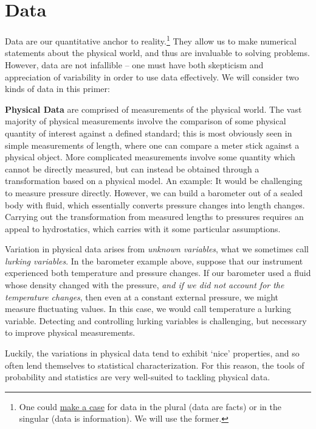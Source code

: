 \documentclass[../primer.tex]{subfiles}
\begin{document}
\section{Data} \label{sec:data}
Data are our quantitative anchor to reality.\footnote{One could
  \href{http://phdcomics.com/comics.php?f=1816}{make a case} for data in the
  plural (data are facts) or in the singular (data is information). We will use
  the former.} They allow us to make numerical statements about the physical
world, and thus are invaluable to solving problems. However, data are not
infallible -- one must have both skepticism and appreciation of variability in
order to use data effectively. We will consider two kinds of data in this
primer:

\textbf{Physical Data} are comprised of measurements of the physical world. The
vast majority of physical measurements involve the comparison of some physical
quantity of interest against a defined standard; this is most obviously seen in
simple measurements of length, where one can compare a meter stick against a
physical object. More complicated measurements involve some quantity which
cannot be directly measured, but can instead be obtained through a
transformation based on a physical model. An example: It would be challenging to
measure pressure directly. However, we can build a barometer out of a sealed
body with fluid, which essentially converts pressure changes into length
changes. Carrying out the transformation from measured lengths to pressures
requires an appeal to hydrostatics, which carries with it some particular
assumptions.

Variation in physical data arises from \emph{unknown variables}, what we
sometimes call \emph{lurking variables}.\cite{box1966} In the barometer example
above, suppose that our instrument experienced both temperature and pressure
changes. If our barometer used a fluid whose density changed with the pressure,
\emph{and if we did not account for the temperature changes}, then even at a
constant external pressure, we might measure fluctuating values. In this case,
we would call temperature a lurking variable. Detecting and controlling lurking
variables is challenging, but necessary to improve physical
measurements.\cite{joiner1981,delRosario2017lurking}

Luckily, the variations in physical data tend to exhibit `nice' properties, and
so often lend themselves to statistical characterization. For this reason, the
tools of probability and statistics are very well-suited to tackling physical
data.
\end{document}
